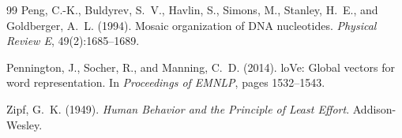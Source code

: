 \documentclass[12pt,a4paper]{article}
\begin{document}
\begin{thebibliography}{99}
Peng, C.-K., Buldyrev, S.~V., Havlin, S., Simons, M., Stanley,
  H.~E., and Goldberger, A.~L. (1994).
\newblock Mosaic organization of {DNA} nucleotides.
\newblock \emph{Physical Review E}, 49(2):1685--1689.

Pennington, J., Socher, R., and Manning, C.~D. (2014).
lo{V}e: Global vectors for word representation.
\newblock In \emph{Proceedings of EMNLP}, pages 1532--1543.

Zipf, G.~K. (1949).
\newblock \emph{Human Behavior and the Principle of Least Effort}.
\newblock Addison-Wesley.

\end{thebibliography}
\end{document}
